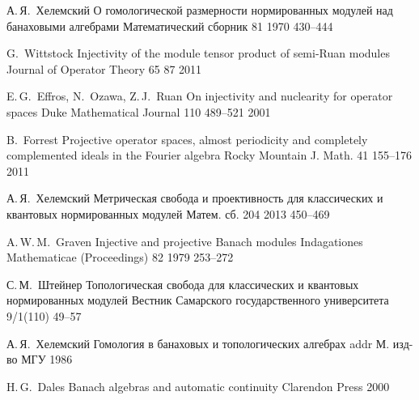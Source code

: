 \documentclass[12pt]{article}
\numberwithin{equation}{subsection}
\theoremstyle{plain}
\begin{document}
\begin{thebibliography}{99}

    \by{} А.\,Я.~Хелемский 
    \paper{} О гомологической размерности нормированных 
        модулей над банаховыми алгебрами 
    \jour{} Математический сборник 
    \vol{} 81 
    \yr{} 1970 
    \pages{} 430--444

    \by{} G.~Wittstock 
    \paper{} Injectivity of the module tensor product of semi-Ruan modules 
    \jour{} Journal of Operator Theory
    \vol{} 65 
    \pages{} 87 
    \yr{} 2011

    \by{} E.\,G.~Effros, N.~Ozawa, Z.\,J.~Ruan 
    \paper{} On injectivity and nuclearity for operator spaces 
    \jour{} Duke Mathematical Journal 
    \vol{} 110 
    \pages{} 489--521 
    \yr{} 2001

    \by{} B.~Forrest 
    \paper{} Projective operator spaces, almost periodicity and 
        completely complemented ideals in the Fourier algebra 
    \jour{} Rocky Mountain J. Math. 
    \vol{} 41 
    \pages{} 155--176 
    \yr{} 2011

    \by{} А.\,Я.~Хелемский 
    \paper{} Метрическая свобода и проективность для классических и квантовых 
        нормированных модулей 
    \jour{} Матем. сб. 
    \vol{} 204 
    \yr{} 2013 
    \pages{} 450--469

    \by{} A.\,W.\,M.~Graven 
    \paper{} Injective and projective Banach modules 
    \jour{} Indagationes Mathematicae (Proceedings) 
    \vol{} 82
    \yr{} 1979 
    \pages{} 253--272

    \by{} С.\,М.~Штейнер 
    \paper{} Топологическая свобода для классических и квантовых 
        нормированных модулей 
    \jour{} Вестник Самарского государственного университета 
    \vol{} 9/1(110) 
    \pages{} 49--57 


    \by{} А.\,Я.~Хелемский 
    \book{} Гомология в банаховых и топологических алгебрах 
    \publ{}addr М. 
    \publ{} изд-во МГУ 
    \yr{} 1986

    \by{} H.\,G.~Dales 
    \book{} Banach algebras and automatic continuity 
    \publ{} Clarendon Press 
    \yr{} 2000


\end{thebibliography}
\end{document}
